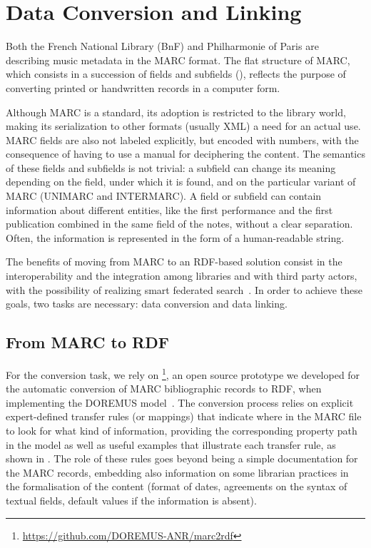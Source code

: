 
\section{Data Conversion and Linking}
\label{sec:conversion-linking}
Both the French National Library (BnF) and Philharmonie of Paris are describing music metadata in the MARC format. The flat structure of MARC, which consists in a succession of fields and subfields (), reflects the purpose of converting printed or handwritten records in a computer form.

Although MARC is a standard, its adoption is restricted to the library world, making its serialization to other formats (usually XML) a need for an actual use. MARC fields are also not labeled explicitly, but encoded with numbers, with the consequence of having to use a manual for deciphering the content. The semantics of these fields and subfields is not trivial: a subfield can change its meaning depending on the field, under which it is found, and on the particular variant of MARC (UNIMARC and INTERMARC). A field or subfield can contain information about different entities, like the first performance and the first publication combined in the same field of the notes, without a clear separation. Often, the information is represented in the form of a human-readable string.
\cite{tennant2002marc}

The benefits of moving from MARC to an RDF-based solution consist in the interoperability and the integration among libraries and with third party actors, with the possibility of realizing smart federated search~\cite{byrne2010strongest, alemu2012linked}. In order to achieve these goals, two tasks are necessary: data conversion and data linking.

\subsection{From MARC to RDF}
For the conversion task, we rely on \footnote{\url{https://github.com/DOREMUS-ANR/marc2rdf}}, an open source prototype we developed for the automatic conversion of MARC bibliographic records to RDF, when implementing the DOREMUS model~\cite{lisena2016exploring}. The conversion process relies on explicit expert-defined transfer rules (or mappings) that indicate where in the MARC file to look for what kind of information, providing the corresponding property path in the model as well as useful examples that illustrate each transfer rule, as shown in . The role of these rules goes beyond being a simple documentation for the MARC records, embedding also information on some librarian practices in the formalisation of the content (format of dates, agreements on the syntax of textual fields, default values if the information is absent).


